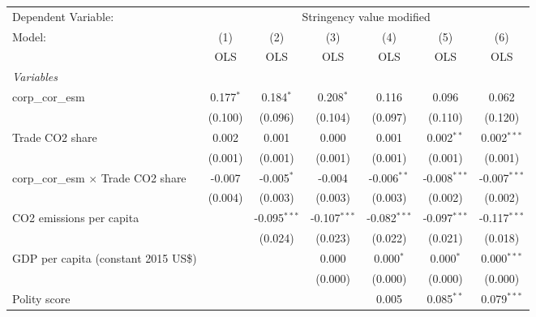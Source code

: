 
\begingroup
\centering
\begin{tabular}{lcccccc}
   \toprule
   Dependent Variable: & \multicolumn{6}{c}{Stringency value modified}\\
   Model:                                     & (1)         & (2)            & (3)            & (4)            & (5)            & (6)\\  
                                              &  OLS        & OLS            & OLS            & OLS            & OLS            & OLS\\  
   \midrule
   \emph{Variables}\\
   corp\_cor\_esm                             & 0.177$^{*}$ & 0.184$^{*}$    & 0.208$^{*}$    & 0.116          & 0.096          & 0.062\\   
                                              & (0.100)     & (0.096)        & (0.104)        & (0.097)        & (0.110)        & (0.120)\\   
   Trade CO2 share                            & 0.002       & 0.001          & 0.000          & 0.001          & 0.002$^{**}$   & 0.002$^{***}$\\   
                                              & (0.001)     & (0.001)        & (0.001)        & (0.001)        & (0.001)        & (0.001)\\   
   corp\_cor\_esm $\times$ Trade CO2 share    & -0.007      & -0.005$^{*}$   & -0.004         & -0.006$^{**}$  & -0.008$^{***}$ & -0.007$^{***}$\\   
                                              & (0.004)     & (0.003)        & (0.003)        & (0.003)        & (0.002)        & (0.002)\\   
   CO2 emissions per capita                   &             & -0.095$^{***}$ & -0.107$^{***}$ & -0.082$^{***}$ & -0.097$^{***}$ & -0.117$^{***}$\\   
                                              &             & (0.024)        & (0.023)        & (0.022)        & (0.021)        & (0.018)\\   
   GDP per capita (constant 2015 US\$)        &             &                & 0.000          & 0.000$^{*}$    & 0.000$^{*}$    & 0.000$^{***}$\\   
                                              &             &                & (0.000)        & (0.000)        & (0.000)        & (0.000)\\   
   Polity score                               &             &                &                & 0.005          & 0.085$^{**}$   & 0.079$^{***}$\\   

\end{tabular}
